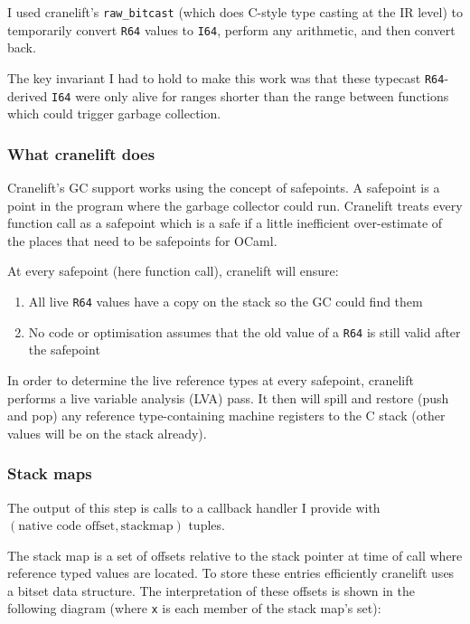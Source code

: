 I used cranelift's \texttt{raw\_bitcast} (which does C-style type casting at the IR level) to
temporarily convert \texttt{R64} values to \texttt{I64}, perform any arithmetic, and then convert
back.

The key invariant I had to hold to make this work was that these typecast \texttt{R64}-derived
\texttt{I64} were only alive for ranges shorter than the range between functions which could
trigger
garbage collection.

\subsubsection{What cranelift does}

Cranelift's GC support works using the concept of safepoints. A safepoint is a point in the program
where the garbage collector could run. Cranelift treats every function call as a
safepoint which is a safe if a little inefficient over-estimate of the places that need to be
safepoints for OCaml.

At every safepoint (here function call), cranelift will ensure:

\begin{enumerate}
      \item All live \texttt{R64} values have a copy on the stack so the GC could find them
      \item No code or optimisation assumes that the old value of a \texttt{R64} is still valid
            after the safepoint
\end{enumerate}

In order to determine the live reference types at every safepoint, cranelift performs a live
variable analysis (LVA) pass. It then will spill and restore (push and pop) any reference
type-containing machine registers to the C stack (other values will be on the stack already).

\subsubsection{Stack maps}

The output of this step is calls to a callback handler I provide with \((\text{native code offset},
\text{stackmap})\)
tuples.

The stack map is a set of offsets relative to the stack pointer at time of call where reference
typed values are located. To store these entries efficiently cranelift uses a bitset data
structure. The interpretation of these offsets is shown in the following diagram (where \texttt{x}
is each member of the stack map's set):

